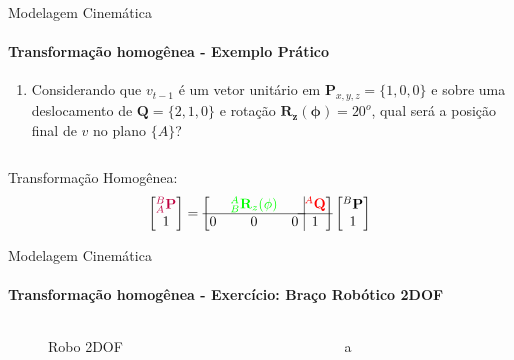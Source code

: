 \documentclass{beamer}
\begin{document}
\begin{frame}{Modelagem Cinemática}
    \framesubtitle{Transformação homogênea - Exemplo Prático}
    \begin{enumerate}
        \item Considerando que $v_{t-1}$ é um vetor unitário em $\mathbf{P}_{x,y,z}=\{1,0,0\}$ e sobre uma deslocamento de $\mathbf{Q}=\{2,1,0\}$ e rotação $\mathbf{R_z(\phi)}=20^o$, qual será a posição final de $v$ no plano $\{A\}$?
    \end{enumerate}
    \begin{columns}
        \begin{column}[c]{0.5\textwidth}
            
        \end{column}
        \begin{column}[c]{0.5\textwidth}
            
        \end{column}
    \end{columns}
    Transformação Homogênea:
    \begin{equation*}
        \begin{bmatrix}
        \color{purple}{{}^B_A\mathbf{P}}\\ 1
        \end{bmatrix}
        =
        \left[
        \begin{matrix}
        & \color{green}{{}_B^A\mathbf{R}_z(\phi)}& \\ \hline
        0 & 0 & 0\\
        \end{matrix} \right.
        \left.
        \vline
        \begin{matrix}
        \color{red}{{}^A\mathbf{Q}}\\ \hline
        1
        \end{matrix} \right]
        \begin{bmatrix}
        {}^B\mathbf{P}\\
        1
        \end{bmatrix}
    \end{equation*}
\end{frame}




\begin{frame}{Modelagem Cinemática}
    \framesubtitle{Transformação homogênea - Exercício: Braço Robótico 2DOF}
    
        \begin{columns}
            \begin{column}[c]{0.5\textwidth}
                \begin{figure}[!ht]
                    
                    \caption{Robo 2DOF}
                \end{figure}
            \end{column}
            \begin{column}[c]{0.5\textwidth}
                a
            \end{column}
        \end{columns}
\end{frame}
\end{document}
